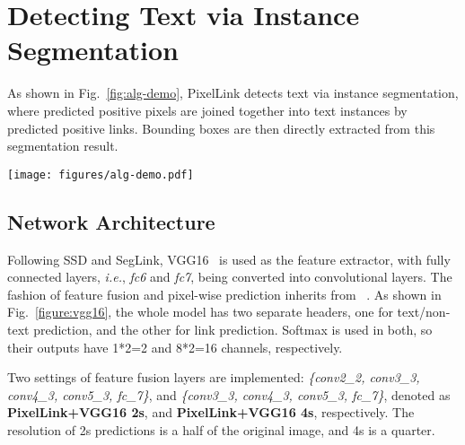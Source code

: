 \documentclass[letterpaper]{article} \usepackage{aaai18}  \usepackage{times}  \usepackage{helvet}  \usepackage{courier}  \usepackage{url}  \usepackage{graphicx}
\begin{document}
	\section{Detecting Text via Instance Segmentation}
	As shown in Fig.~\ref{fig:alg-demo}, PixelLink detects text via instance segmentation, where predicted positive pixels are joined together into text instances by predicted positive links. Bounding boxes are then directly extracted from this segmentation result.
	\begin{figure*}[!h]
		\begin{center}
			\texttt{[image: figures/alg-demo.pdf]}
		\end{center}
		\caption{Architecture of PixelLink. A CNN model is trained to perform two kinds of pixel-wise predictions: text/non-text prediction and link prediction. After being thresholded, positive pixels are joined together by positive links, achieving instance segmentation. \emph{minAreaRect} is then applied to extract bounding boxes directly from the segmentation result. Noise predictions can be efficiently removed using post-filtering. An input sample is shown for better illustration. The eight heat-maps in the dashed box stand for the link predictions in eight directions. Although some words are difficult to separate in text/non-text prediction, they are separable through link predictions.}
		\label{fig:alg-demo}
	\end{figure*}
	\subsection{Network Architecture}
	Following SSD and SegLink, VGG16~\cite{simonyan2014VGG} is used as the feature extractor, with fully connected layers, \emph{i.e.}, \emph{fc6} and \emph{fc7}, being converted into convolutional layers. The fashion of feature fusion and pixel-wise prediction inherits from ~\cite{Long2015FCN}. As shown in Fig.~\ref{figure:vgg16}, the whole model has two separate headers, one for text/non-text prediction, and the other for link prediction. Softmax is used in both, so their outputs have 1*2=2 and 8*2=16 channels, respectively.
	
	Two settings of feature fusion layers are implemented: \emph{\{conv2\_2, conv3\_3, conv4\_3, conv5\_3, fc\_7\}}, and \emph{\{conv3\_3, conv4\_3, conv5\_3, fc\_7\}}, denoted as \textbf{PixelLink+VGG16 2s}, and \textbf{PixelLink+VGG16 4s}, respectively. The resolution of 2s predictions is a half of the original image, and 4s is a quarter.
	
\end{document}
